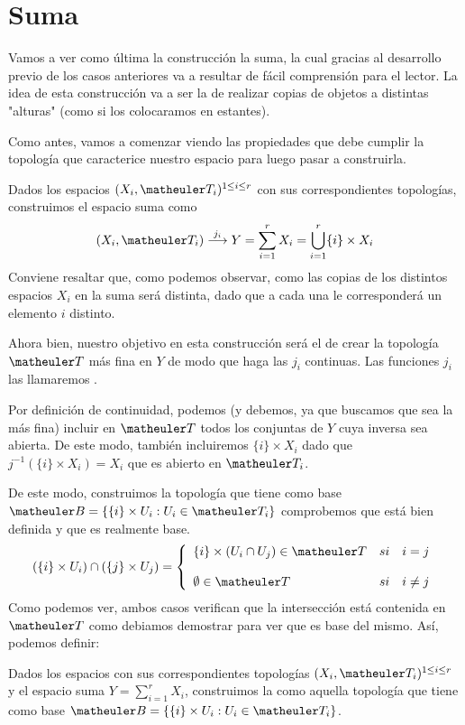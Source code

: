 \section{Suma}
Vamos a ver como última la construcción la suma, la cual gracias al desarrollo previo de los casos anteriores va a resultar de fácil comprensión para el lector. La idea de esta construcción va a ser la de realizar copias de objetos a distintas "alturas" (como si los colocaramos en estantes). 

Como antes, vamos a comenzar viendo las propiedades que debe cumplir la topología que caracterice nuestro espacio para luego pasar a construirla.

Dados los espacios $(X_i, \T_i)^{1\le i \le r}$ con sus correspondientes topologías, construimos el espacio suma como
\begin{equation}
(X_i, \T_i)\stackrel{j_i}\longrightarrow Y=\sum_{i=1}^rX_i=\bigcup_{i=1}^r\{i\}\times X_i
\end{equation}
Conviene resaltar que, como podemos observar, como las copias de los distintos espacios $X_i$ en la suma será distinta, dado que a cada una le corresponderá un elemento $i$ distinto.

Ahora bien, nuestro objetivo en esta construcción será el de crear la topología $\T$ más fina en $Y$ de modo que haga las $j_i$ continuas. Las funciones $j_i$ las llamaremos .

Por definición de continuidad, podemos (y debemos, ya que buscamos que sea la más fina) incluir en $\T$ todos los conjuntas de $Y$ cuya inversa sea abierta.
De este modo, también incluiremos $\{i\}\times X_i$ dado que $j^{-1}(\{i\}\times X_i)=X_i$ que es abierto en $\T_i$.

De este modo, construimos la topología que tiene como base $\B=\{\{i\}\times U_i:U_i\in\T_i\}$ comprobemos que está bien definida y que es realmente base.
\begin{equation}
(\{i\}\times U_i)\cap(\{j\}\times U_j)=
\left\{ \begin{array}{lcc}
\{i\}\times(U_i\cap U_j)\in\T &   si  & i=j \\
\\  \emptyset\in\T& si & i\neq j 
\end{array}
\right.
\end{equation}
Como podemos ver, ambos casos verifican que la intersección está contenida en $\T$ como debiamos demostrar para ver que es base del mismo.
Así, podemos definir:
\begin{defi}
	Dados los espacios con sus correspondientes topologías $(X_i, \T_i)^{1\le i \le r}$ y el espacio suma $Y=\sum_{i=1}^rX_i$, construimos la  como aquella topología que tiene como base $\B=\{\{i\}\times U_i:U_i\in\T_i\}$.
\end{defi}

